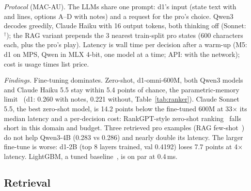 \emph{Protocol} (MAC-AU). The LLMs share one prompt: d1's input (state text with  and  lines, options A--D with notes) and a request for the pro's choice. Qwen3~\cite{qwen2025qwen3} decodes greedily, Claude Haiku with 16 output tokens, both thinking off (Sonnet: $^\dagger$); the RAG variant prepends the 3 nearest train-split pro states (600 characters each, plus the pro's play). Latency is wall time per decision after a warm-up (M5: d1 on MPS, Qwen in MLX 4-bit, one model at a time; API: with the network); cost is usage times list price. %

\emph{Findings.} Fine-tuning dominates. Zero-shot, d1-omni-600M, both Qwen3 models and Claude Haiku 5.5 stay within 5.4 points of chance, the parametric-memory limit~\cite{mallen2023popqa,lim2026l11} (d1: 0.260 with notes, 0.221 without, Table~\ref{tab:ranker}). Claude Sonnet 5.5, the best zero-shot model, is 14.2 points below the fine-tuned 600M at 33$\times$ its median latency and a per-decision cost: RankGPT-style zero-shot ranking~\cite{sun2023rankgpt,cap6938L10} falls short in this domain and budget. Three retrieved pro examples (RAG few-shot~\cite{lim2026l11}) do not help Qwen3-4B (0.283 vs 0.286) and nearly double its latency. The larger fine-tune is worse: d1-2B (top 8 layers trained, val 0.4192) loses 7.7 points at 4$\times$ latency. LightGBM, a tuned baseline~\cite{rendle2020ncfvsmf,lim2026l13}, is on par at 0.4\,ms. %

\subsection{Retrieval}
\label{sec:retr}

